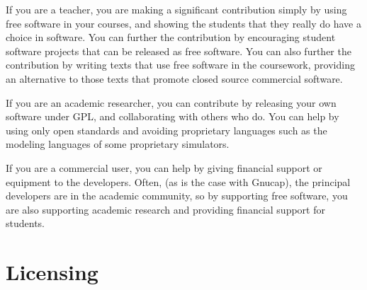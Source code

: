 If you are a teacher, you are making a significant contribution simply
by using free software in your courses, and showing the students that
they really do have a choice in software. You can further the
contribution by encouraging student software projects that can be
released as free software. You can also further the contribution by
writing texts that use free software in the coursework, providing an
alternative to those texts that promote closed source commercial
software.

If you are an academic researcher, you can contribute by releasing
your own software under GPL, and collaborating with others who do. You
can help by using only open standards and avoiding proprietary
languages such as the modeling languages of some proprietary
simulators.

If you are a commercial user, you can help by giving financial support
or equipment to the developers. Often, (as is the case with Gnucap),
the principal developers are in the academic community, so by
supporting free software, you are also supporting academic research
and providing financial support for students.
\section{Licensing}
	
